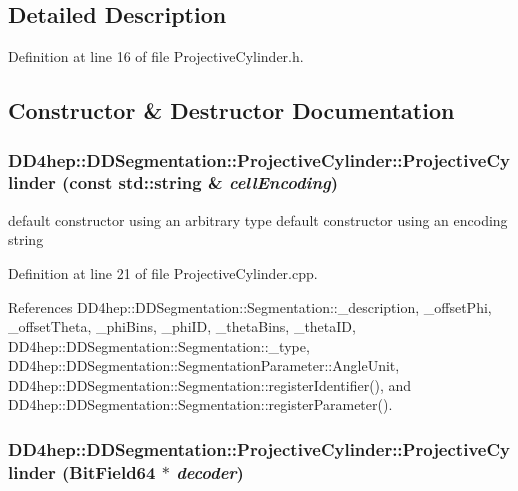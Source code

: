 \subsection{Detailed Description}


Definition at line 16 of file ProjectiveCylinder.h.

\subsection{Constructor \& Destructor Documentation}
\hypertarget{class_d_d4hep_1_1_d_d_segmentation_1_1_projective_cylinder_ad99ec82db9b7ce8a7433bfa524c3040b}{
\subsubsection[{ProjectiveCylinder}]{\setlength{\rightskip}{0pt plus 5cm}DD4hep::DDSegmentation::ProjectiveCylinder::ProjectiveCylinder (const std::string \& {\em cellEncoding})}}
\label{class_d_d4hep_1_1_d_d_segmentation_1_1_projective_cylinder_ad99ec82db9b7ce8a7433bfa524c3040b}


default constructor using an arbitrary type default constructor using an encoding string 

Definition at line 21 of file ProjectiveCylinder.cpp.

References DD4hep::DDSegmentation::Segmentation::\_\-description, \_\-offsetPhi, \_\-offsetTheta, \_\-phiBins, \_\-phiID, \_\-thetaBins, \_\-thetaID, DD4hep::DDSegmentation::Segmentation::\_\-type, DD4hep::DDSegmentation::SegmentationParameter::AngleUnit, DD4hep::DDSegmentation::Segmentation::registerIdentifier(), and DD4hep::DDSegmentation::Segmentation::registerParameter().\hypertarget{class_d_d4hep_1_1_d_d_segmentation_1_1_projective_cylinder_afebb5add96b7e183f5e250e5e347f917}{
\subsubsection[{ProjectiveCylinder}]{\setlength{\rightskip}{0pt plus 5cm}DD4hep::DDSegmentation::ProjectiveCylinder::ProjectiveCylinder ({\bf BitField64} $\ast$ {\em decoder})}}
\label{class_d_d4hep_1_1_d_d_segmentation_1_1_projective_cylinder_afebb5add96b7e183f5e250e5e347f917}


